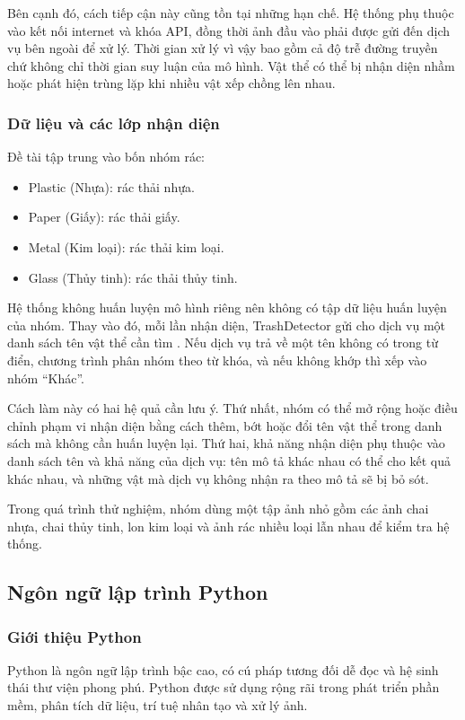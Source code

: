 \documentclass[a4paper,13pt]{extarticle}
\begin{document}
Bên cạnh đó, cách tiếp cận này cũng tồn tại những hạn chế. Hệ thống phụ thuộc vào kết nối internet và khóa API, đồng thời ảnh đầu vào phải được gửi đến dịch vụ bên ngoài để xử lý. Thời gian xử lý vì vậy bao gồm cả độ trễ đường truyền chứ không chỉ thời gian suy luận của mô hình. Vật thể có thể bị nhận diện nhầm hoặc phát hiện trùng lặp khi nhiều vật xếp chồng lên nhau. 

\subsubsection{Dữ liệu và các lớp nhận diện}

Đề tài tập trung vào bốn nhóm rác:
\begin{itemize}
    \item[-]  Plastic (Nhựa): rác thải nhựa.
    \item[-] Paper (Giấy): rác thải giấy.
    \item[-] Metal (Kim loại): rác thải kim loại.
    \item[-] Glass (Thủy tinh): rác thải thủy tinh.

\end{itemize}




Hệ thống không huấn luyện mô hình riêng nên không có tập dữ liệu huấn luyện của nhóm. Thay vào đó, mỗi lần nhận diện, TrashDetector gửi cho dịch vụ một danh sách tên vật thể cần tìm . Nếu dịch vụ trả về một tên không có trong từ điển, chương trình phân nhóm theo từ khóa, và nếu không khớp thì xếp vào nhóm “Khác”.

Cách làm này có hai hệ quả cần lưu ý. Thứ nhất, nhóm có thể mở rộng hoặc điều chỉnh phạm vi nhận diện bằng cách thêm, bớt hoặc đổi tên vật thể trong danh sách mà không cần huấn luyện lại. Thứ hai, khả năng nhận diện phụ thuộc vào danh sách tên và khả năng của dịch vụ: tên mô tả khác nhau có thể cho kết quả khác nhau, và những vật mà dịch vụ không nhận ra theo mô tả sẽ bị bỏ sót.

Trong quá trình thử nghiệm, nhóm dùng một tập ảnh nhỏ gồm các ảnh chai nhựa, chai thủy tinh, lon kim loại và ảnh rác nhiều loại lẫn nhau để kiểm tra hệ thống.

\subsection{Ngôn ngữ lập trình Python}

\subsubsection{Giới thiệu Python}
Python là ngôn ngữ lập trình bậc cao, có cú pháp tương đối dễ đọc và hệ sinh thái thư viện phong phú. Python được sử dụng rộng rãi trong phát triển phần mềm, phân tích dữ liệu, trí tuệ nhân tạo và xử lý ảnh.
\end{document}
